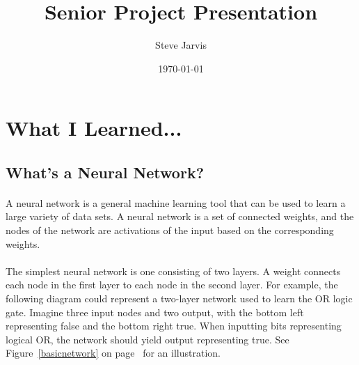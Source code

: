 \documentclass{article}
\title{Senior Project Presentation}
\author{Steve Jarvis}
\date{\today}
\begin{document}
\maketitle

\section{What I Learned...}
\subsection{What's a Neural Network?}
    \paragraph{}A neural network is a general machine learning tool that can be used to 
    learn a large variety of data sets. A neural network is a set of connected weights,
    and the nodes of the network are activations of the input based on the corresponding
    weights.
    \paragraph{}The simplest neural network is one consisting of two layers. A weight
    connects each node in the first layer to each node in the second layer. For example,
    the following diagram could represent a two-layer network used to learn the OR logic
    gate. Imagine three input nodes and two output, with the bottom left representing false
    and the bottom right true. When inputting bits representing logical OR, the network
    should yield output representing true. See Figure~\ref{basicnetwork} on 
    page~\pageref{basicnetwork} for an illustration.
\end{document}
